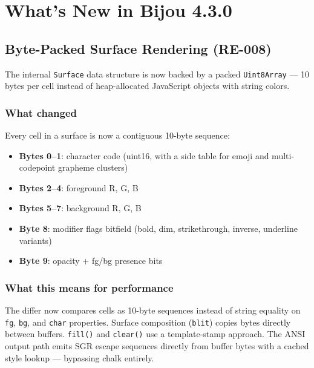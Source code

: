 \chapter{What's New in Bijou 4.3.0}\label{record-277}

\smallskip

\section{Byte-Packed Surface Rendering (RE-008)}\label{record-277-byte-packed-surface-rendering-re-008}

The internal \texttt{S\allowbreak{}u\allowbreak{}r\allowbreak{}f\allowbreak{}a\allowbreak{}c\allowbreak{}e} data structure is now backed by a packed \texttt{U\allowbreak{}i\allowbreak{}n\allowbreak{}t\allowbreak{}8\allowbreak{}A\allowbreak{}r\allowbreak{}r\allowbreak{}a\allowbreak{}y} --- 10 bytes per cell instead of heap-allocated JavaScript objects with string colors.

\subsection{What changed}\label{record-277-what-changed}

Every cell in a surface is now a contiguous 10-byte sequence:

\begin{itemize}
\tightlist
\item
  \textbf{Bytes 0--1}: character code (uint16, with a side table for emoji and multi-codepoint grapheme clusters)
\item
  \textbf{Bytes 2--4}: foreground R, G, B
\item
  \textbf{Bytes 5--7}: background R, G, B
\item
  \textbf{Byte 8}: modifier flags bitfield (bold, dim, strikethrough, inverse, underline variants)
\item
  \textbf{Byte 9}: opacity + fg/bg presence bits
\end{itemize}

\subsection{What this means for performance}\label{record-277-what-this-means-for-performance}

The differ now compares cells as 10-byte sequences instead of string equality on \texttt{f\allowbreak{}g}, \texttt{b\allowbreak{}g}, and \texttt{c\allowbreak{}h\allowbreak{}a\allowbreak{}r} properties. Surface composition (\texttt{b\allowbreak{}l\allowbreak{}i\allowbreak{}t}) copies bytes directly between buffers. \texttt{f\allowbreak{}i\allowbreak{}l\allowbreak{}l\allowbreak{}(\allowbreak{})} and \texttt{c\allowbreak{}l\allowbreak{}e\allowbreak{}a\allowbreak{}r\allowbreak{}(\allowbreak{})} use a template-stamp approach. The ANSI output path emits SGR escape sequences directly from buffer bytes with a cached style lookup --- bypassing chalk entirely.


